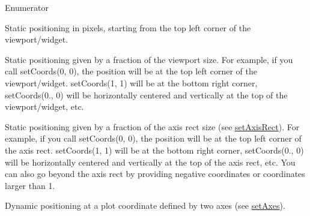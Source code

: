 \begin{Desc}
\item[Enumerator]\par
\begin{description}
\item[{\em 
pt\+Absolute\hypertarget{classQCPItemPosition_aad9936c22bf43e3d358552f6e86dbdc8a564f5e53e550ead1ec5fc7fc7d0b73e0}{}\label{classQCPItemPosition_aad9936c22bf43e3d358552f6e86dbdc8a564f5e53e550ead1ec5fc7fc7d0b73e0}
}]Static positioning in pixels, starting from the top left corner of the viewport/widget. \item[{\em 
pt\+Viewport\+Ratio\hypertarget{classQCPItemPosition_aad9936c22bf43e3d358552f6e86dbdc8ac7d6aa89ceacb39658b0d6da061c789a}{}\label{classQCPItemPosition_aad9936c22bf43e3d358552f6e86dbdc8ac7d6aa89ceacb39658b0d6da061c789a}
}]Static positioning given by a fraction of the viewport size. For example, if you call set\+Coords(0, 0), the position will be at the top left corner of the viewport/widget. set\+Coords(1, 1) will be at the bottom right corner, set\+Coords(0., 0) will be horizontally centered and vertically at the top of the viewport/widget, etc. \item[{\em 
pt\+Axis\+Rect\+Ratio\hypertarget{classQCPItemPosition_aad9936c22bf43e3d358552f6e86dbdc8a01080fd00eaf09fa238ef6b73bbfef75}{}\label{classQCPItemPosition_aad9936c22bf43e3d358552f6e86dbdc8a01080fd00eaf09fa238ef6b73bbfef75}
}]Static positioning given by a fraction of the axis rect size (see \hyperlink{classQCPItemPosition_a0cd9b326fb324710169e92e8ca0041c2}{set\+Axis\+Rect}). For example, if you call set\+Coords(0, 0), the position will be at the top left corner of the axis rect. set\+Coords(1, 1) will be at the bottom right corner, set\+Coords(0., 0) will be horizontally centered and vertically at the top of the axis rect, etc. You can also go beyond the axis rect by providing negative coordinates or coordinates larger than 1. \item[{\em 
pt\+Plot\+Coords\hypertarget{classQCPItemPosition_aad9936c22bf43e3d358552f6e86dbdc8ad5ffb8dc99ad73263f7010c77342294c}{}\label{classQCPItemPosition_aad9936c22bf43e3d358552f6e86dbdc8ad5ffb8dc99ad73263f7010c77342294c}
}]Dynamic positioning at a plot coordinate defined by two axes (see \hyperlink{classQCPItemPosition_a2185f45c75ac8cb9be89daeaaad50e37}{set\+Axes}). \end{description}
\end{Desc}


